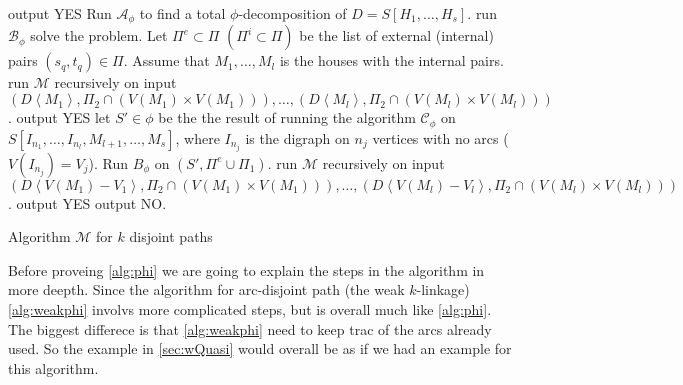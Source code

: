\begin{algorithm}
    \begin{algorithmic}[1]
        \IF{$\Pi=\emptyset$}
            \STATE output YES
        \ENDIF
        \STATE Run $\mathcal{A}_{\phi}$ to find a total $\phi$-decomposition of $D=S[H_1,\dots,H_s]$.
            \STATE run $\mathcal{B}_{\phi}$ solve the problem.
        \ENDIF
        \STATE Let $\Pi^e\subset \Pi$ $(\Pi^i\subset \Pi)$ be the list of external (internal) pairs $(s_q,t_q)\in \Pi$.
        \STATE Assume that $M_1,\dots , M_l$ is the houses with the internal pairs.
             \label{state 3a}
                \STATE run $\mathcal{M}$ recursively on input $(D\left<M_1\right>, \Pi_2\cap (V(M_1)\times V(M_1))) , \dots ,(D\left<M_l\right>, \Pi_2\cap (V(M_l)\times V(M_l)))$.
                    \STATE output YES
                \ENDIF
            \ENDIF
             \label{state 3b}
                    \STATE let $S'\in \phi$ be the the result of running the algorithm $\mathcal{C}_\phi$ on $S[I_{n_1},\dots,I_{n_l},M_{l+1},\dots , M_s]$, where $I_{n_j}$ is the digraph on $n_j$ vertices with no arcs ($V(I_{n_j})=V_j$).            
                    \STATE Run $B_{\phi}$ on $(S',\Pi^e\cup\Pi_1)$.
                        \STATE run $\mathcal{M}$ recursively on input $(D\left<V(M_1)-V_1\right>, \Pi_2\cap (V(M_1)\times V(M_1))) , \dots ,(D\left<V(M_l)-V_l\right>, \Pi_2\cap (V(M_l)\times V(M_l)))$.
                    \ENDIF 
                        \STATE output YES
                    \ENDIF
                \ENDFOR
            \ENDIF
        \ENDFOR 
            \STATE output NO.
        \ENDIF
    \end{algorithmic}
    \caption{Algorithm $\mathcal{M}$ for $k$ disjoint paths}
    \label{alg:phi}
\end{algorithm}
Before proveing \autoref{alg:phi} we are going to explain the steps in the algorithm in more deepth.
Since the algorithm for arc-disjoint path (the weak $k$-linkage) \autoref{alg:weakphi} involvs more complicated steps, but is overall much like \autoref{alg:phi}. 
The biggest differece is that \autoref{alg:weakphi} need to keep trac of the arcs already used. 
So the example in \autoref{sec:wQuasi} would overall be as if we had an example for this algorithm.

